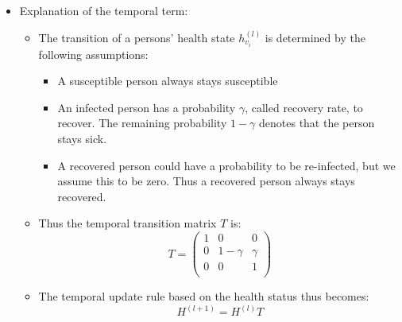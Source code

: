 \begin{itemize}
\begin{itemize}
\begin{itemize}
		\end{itemize}
	\end{itemize}
	\item Explanation of the temporal term:
	\begin{itemize}
		\item The transition of a persons' health state $h_{v_i}^{(l)}$ is determined by the following assumptions:
		\begin{itemize}
			\item A susceptible person always stays susceptible
			\item An infected person has a probability $\gamma$, called recovery rate, to recover. The remaining probability $1-\gamma$ denotes that the person stays sick.
			\item A recovered person could have a probability to be re-infected, but we assume this to be zero. Thus a recovered person always stays recovered.
		\end{itemize}
		\item Thus the temporal transition matrix $T$ is:
		\begin{equation}
			T = 
			\begin{pmatrix}
				1 &     0    & 0      \\
				0 & 1-\gamma & \gamma \\
				0 &     0    & 1      \\
			\end{pmatrix}
		\end{equation}
		\item The temporal update rule based on the health status thus becomes:
		\begin{equation}
			H^{(l+1)} = H^{(l)} T
		\end{equation}
	\end{itemize}
\end{itemize}